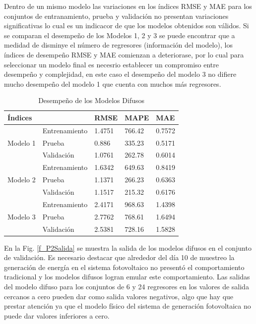 \documentclass[12pt]{article}
\begin{document}
\begin{itemize}
Dentro de un mismo modelo las variaciones en los índices RMSE y MAE para los conjuntos de entranamiento, prueba y validación no presentan variaciones significativas lo cual es un indicacor de que los modelos obtenidos son válidos. Si se comparan el desempeño de los Modelos 1, 2 y 3 se puede encontrar que a medidad de disminye el número de regresores (información del modelo), los índices de desempeño RMSE y MAE comienzan a deteriorase, por lo cual para seleccionar un modelo final es necesrio establecer un compromiso entre desempeño y complejidad, en este caso el desempeño del modelo 3 no difiere mucho desempeño del modelo 1 que cuenta con muchos más regresores.

\begin{table}[htbp]
  \centering
  \caption{Desempeño de los Modelos Difusos}
    \begin{tabular}{|c|l|l|l|l|}
\hline
\multicolumn{1}{|l|}{Índices} &               & RMSE   & MAPE   & MAE    \\ \hline
\multirow{3}{*}{Modelo   1}   & Entrenamiento & 1.4751 & 766.42 & 0.7572 \\ \cline{2-5}
                              & Prueba        & 0.886  & 335.23 & 0.5171 \\ \cline{2-5}
                              & Validación    & 1.0761 & 262.78 & 0.6014 \\ \hline
\multirow{3}{*}{Modelo   2}   & Entrenamiento & 1.6342 & 649.63 & 0.8419 \\ \cline{2-5}
                              & Prueba        & 1.1371 & 266.23 & 0.6363 \\ \cline{2-5}
                              & Validación    & 1.1517 & 215.32 & 0.6176 \\ \hline
\multirow{3}{*}{Modelo   3}   & Entrenamiento & 2.4171 & 968.63 & 1.4398 \\ \cline{2-5}
                              & Prueba        & 2.7762 & 768.61 & 1.6494 \\ \cline{2-5}
                              & Validación    & 2.5381 & 728.16 & 1.5828 \\ \hline
    \end{tabular}%
  \label{t_P2TM}%
\end{table}%

En la Fig. \ref{f_P2Salida} se muestra la salida de los modelos difusos en el conjunto de validación. Es necesario destacar que alrededor del día 10 de muestreo la generación de energía en el sistema fotovoltaico no presentó el comportamiento tradicional y los modelos difusos logran emular este comportamiento. Las salidas del modelo difuso para los conjuntos de 6 y 24 regresores en los valores de salida cercanos a cero pueden dar como salida valores negativos, algo que hay que prestar atención ya que el modelo físico del sistema de generación fotovoltaica no puede dar valores inferiores a cero.


\end{itemize}
\end{document}

